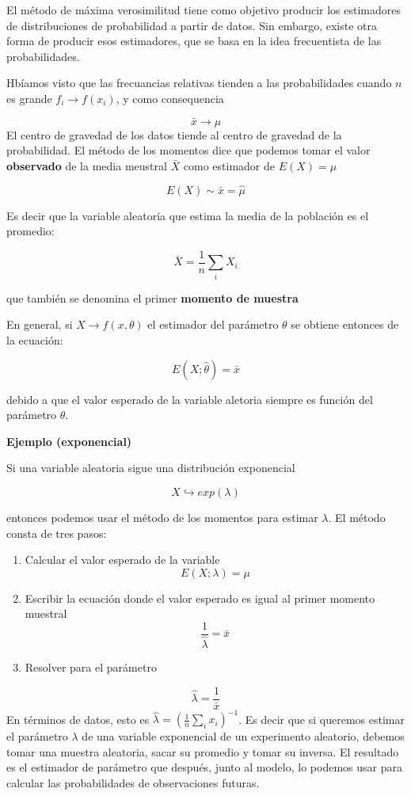 \documentclass[
]{book}
\begin{document}
El método de máxima verosimilitud tiene como objetivo producir los estimadores de distribuciones de probabilidad a partir de datos. Sin embargo, existe otra forma de producir esos estimadores, que se basa en la idea frecuentista de las probabilidades.

Hbíamos visto que las frecuancias relativas tienden a las probabilidades cuando \(n\) es grande \(f_i \rightarrow f(x_i)\), y como consequencia

\[\bar{x} \rightarrow \mu\]
El centro de gravedad de los datos tiende al centro de gravedad de la probabilidad.
El método de los momentos dice que podemos tomar el valor \textbf{observado} de la media meustral \(\bar{X}\) como estimador de \(E(X)=\mu\)

\[E(X)\sim \bar{x}=\hat{\mu}\]

Es decir que la variable aleatoria que estima la media de la población es el promedio:

\[\bar{X}= \frac{1}{n}\sum_i X_i\]

que también se denomina el primer \textbf{momento de muestra}

En general, si \(X \rightarrow f(x, \theta)\) el estimador del parámetro \(\theta\) se obtiene entonces de la ecuación:

\[E(X; \hat{\theta})=\bar{x}\]

debido a que el valor esperado de la variable aletoria siempre es función del parámetro \(\theta\).

\textbf{Ejemplo (exponencial)}

Si una variable aleatoria sigue una distribución exponencial

\[X \hookrightarrow exp(\lambda)\]

entonces podemos usar el método de los momentos para estimar \(\lambda\). El método consta de tres pasos:

\begin{enumerate}
\def\labelenumi{\arabic{enumi}.}
\item
  Calcular el valor esperado de la variable \[E(X; \lambda)=\mu\]
\item
  Escribir la ecuación donde el valor esperado es igual al primer momento muestral \[\frac{1}{\hat{\lambda}}=\bar{x}\]
\item
  Resolver para el parámetro
\end{enumerate}

\[\hat{\lambda}=\frac{1}{\bar{x}}\]
En términos de datos, esto es \(\hat{\lambda}=(\frac{1}{n}\sum_i x_i)^{-1}\). Es decir que si queremos estimar el parámetro \(\lambda\) de una variable exponencial de un experimento aleatorio, debemos tomar una muestra aleatoria, sacar su promedio y tomar su inversa. El resultado es el estimador de parámetro que después, junto al modelo, lo podemos usar para calcular las probabilidades de observaciones futuras.
\end{document}
